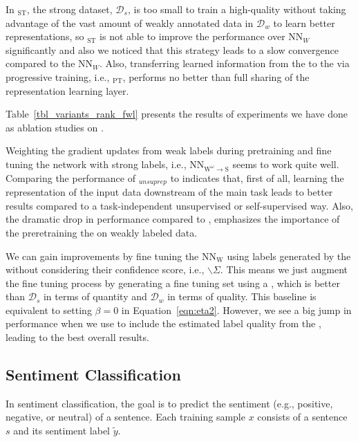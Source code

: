 In \cwsnospace$_\text{ST}$,  the strong dataset, $\mathcal{D}_s$, is too small to train a high-quality \cnet without taking advantage of the vast amount of weakly annotated data in $\mathcal{D}_w$ to learn better representations, so \cwsnospace$_\text{ST}$ is not able to improve the performance over $\text{NN}_W$ significantly and also we noticed that this strategy leads to a slow convergence compared to the $\text{NN}_W$. 
Also, transferring learned information from the \tnet to the \cnet via progressive training, i.e., \cwsnospace$_\text{PT}$, performs no better than full sharing of the representation learning layer.




Table~\ref{tbl_variants_rank_fwl} presents the results of experiments we have done as ablation studies on \fwl. 

Weighting the gradient updates from weak labels during pretraining and fine tuning the network with strong labels, i.e., NN$_{\text{W}^\omega \to \text{S}}$ seems to work quite well.
%
Comparing the performance of \fwlnospace$_{unsuprep}$ to \fwl indicates that, first of all, learning the representation of the input data downstream of the main task leads to better results compared to a task-independent unsupervised or self-supervised way. Also, the dramatic drop in performance compared to \fwl, emphasizes the importance of the preretraining the \std on weakly labeled data.

%
We can gain improvements by fine tuning the NN$_\text{W}$ using labels generated by the \tch without considering their confidence score, i.e., \fwlnospace$\backslash\Sigma$. This means we just augment the fine tuning process by generating a fine tuning set using a \tch, which is better than $\mathcal{D}_s$ in terms of quantity and $\mathcal{D}_w$ in terms of quality. This baseline is equivalent to setting $\beta = 0$ in Equation~\ref{eqn:eta2}. However, we see a big jump in performance when we use \fwl to include the estimated label quality from the \tch, leading to the best overall results.

\subsection{Sentiment Classification}
In sentiment classification, the goal is to predict the sentiment (e.g., positive, negative, or neutral) of a sentence. Each training sample $x$ consists of a sentence $s$ and its sentiment label $\tilde{y}$.

